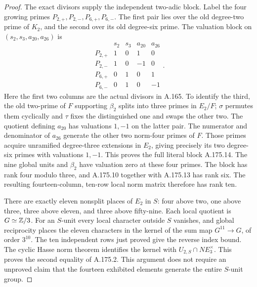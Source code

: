 \begin{proof}
The exact divisors supply the independent two-adic block.
Label the four growing primes $P_{2,+},P_{2,-},P_{6,+},P_{6,-}$.
The first pair lies over the old degree-two prime of $K_2$, and
the second over its old degree-six prime.  The valuation block on
$(s_2,s_3,a_{20},a_{26})$ is
\[
 \begin{array}{c|rrrr}
 &s_2&s_3&a_{20}&a_{26}\\ \hline
 P_{2,+}&1&0&1&0\\
 P_{2,-}&1&0&-1&0\\
 P_{6,+}&0&1&0&1\\
 P_{6,-}&0&1&0&-1
 \end{array}.
\tag{A.175.14}
\]
Here the first two columns are the actual divisors in A.165.
To identify the third, the old two-prime of $F$ supporting
$\beta_2$ splits into three primes in $E_2/F$; $\sigma$ permutes
them cyclically and $\tau$ fixes the distinguished one and swaps
the other two.  The quotient defining $a_{20}$ has valuations
$1,-1$ on the latter pair.  The numerator and denominator of
$a_{26}$ generate the other two norm-four primes of $F$.
Those primes acquire unramified degree-three extensions in $E_2$,
giving precisely its two degree-six primes with valuations $1,-1$.
This proves the full literal block A.175.14.
The nine global units and $\beta_2$ have valuation zero at these
four primes.  The block has rank four modulo three, and
A.175.10 together with A.175.13 has rank six.  The resulting
fourteen-column, ten-row local norm matrix therefore has rank ten.

There are exactly eleven nonsplit places of $E_2$ in $S$: four
above two, one above three, three above eleven, and three above
fifty-nine.  Each local quotient is $G\simeq\mathbb Z/3$.
For an $S$-unit every local character outside $S$ vanishes, and
global reciprocity places the eleven characters in the kernel of
the sum map $G^{11}\to G$, of order $3^{10}$.
The ten independent rows just proved give the reverse index bound.
The cyclic Hasse norm theorem identifies the kernel with
$U_{2,S}\cap N E_3^\times$.  This proves the second equality
of A.175.2.  This argument does not require an unproved claim that
the fourteen exhibited elements generate the entire $S$-unit group.


\end{proof}
